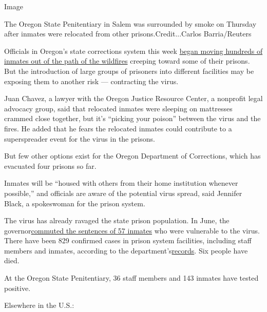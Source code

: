 Image

The Oregon State Penitentiary in Salem was surrounded by smoke on
Thursday after inmates were relocated from other prisons.Credit...Carlos
Barria/Reuters

Officials in Oregon's state corrections system this week
\href{https://www.nytimes3xbfgragh.onion/2020/09/11/us/wildfires-live-updates.html}{began
moving hundreds of inmates out of the path of the wildfires} creeping
toward some of their prisons. But the introduction of large groups of
prisoners into different facilities may be exposing them to another risk
--- contracting the virus.

Juan Chavez, a lawyer with the Oregon Justice Resource Center, a
nonprofit legal advocacy group, said that relocated inmates were
sleeping on mattresses crammed close together, but it's ``picking your
poison'' between the virus and the fires. He added that he fears the
relocated inmates could contribute to a superspreader event for the
virus in the prisons.

But few other options exist for the Oregon Department of Corrections,
which has evacuated four prisons so far.

Inmates will be ``housed with others from their home institution
whenever possible,'' and officials are aware of the potential virus
spread, said Jennifer Black, a spokeswoman for the prison system.

The virus has already ravaged the state prison population. In June, the
governor\href{https://www.oregon.gov/newsroom/Pages/NewsDetail.aspx?newsid=36856}{commuted
the sentences of 57 inmates} who were vulnerable to the virus. There
have been 829 confirmed cases in prison system facilities, including
staff members and inmates, according to the
department's\href{https://www.oregon.gov/doc/covid19/Pages/covid19-tracking.aspx}{records}.
Six people have died.

At the Oregon State Penitentiary, 36 staff members and 143 inmates have
tested positive.

Elsewhere in the U.S.:

